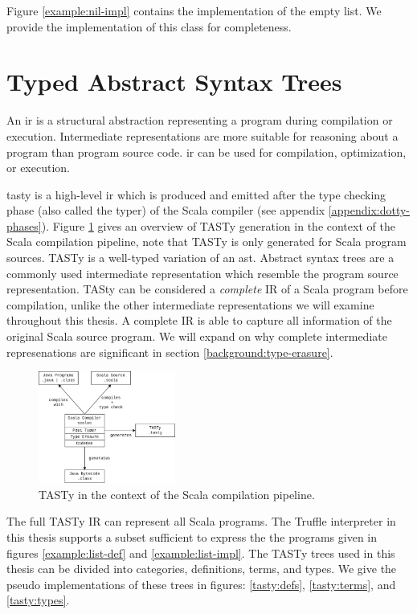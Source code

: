 Figure \ref{example:nil-impl} contains the implementation of the empty list. 
We provide the implementation of this class for completeness.


\section{Typed Abstract Syntax Trees}

An \acrfull{ir} is a structural abstraction representing a program during compilation or execution. 
Intermediate representations are more suitable for reasoning about a program than program source code. 
\acrshort{ir} can be used for compilation\cite{llvm}, optimization\cite{llvm}\cite{ssa}, or execution\cite{java:vm-spec}\cite{clr:spec}.

\acrfull{tasty} is a high-level \acrfull{ir} which is produced and emitted after the type checking phase (also called the typer) of the Scala compiler (see appendix \ref{appendix:dotty-phases}).
Figure \ref{system:tasty} gives an overview of TASTy generation in the context of the Scala compilation pipeline, note that TASTy is only generated for Scala program sources.
TASTy is a well-typed variation of an \acrfull{ast}.
Abstract syntax trees are a commonly used intermediate representation which resemble the program source representation.
TASty can be considered a \textit{complete} IR of a Scala program before compilation, unlike the other intermediate representations we will examine throughout this thesis.
A complete IR is able to capture all information of the original Scala source program.
We will expand on why complete intermediate represenations are significant in section \ref{background:type-erasure}.

\begin{figure}[H]
	\centering
	\includegraphics[width=0.4\textwidth]{figures/scala-pipeline.png}
	\caption{TASTy in the context of the Scala compilation pipeline.}
	\label{system:tasty}
\end{figure}

The full TASTy IR can represent all Scala programs.
The Truffle interpreter in this thesis supports a subset sufficient to express the the programs given in figures \ref{example:list-def} and \ref{example:list-impl}.
The TASTy trees used in this thesis can be divided into categories, definitions, terms, and types. 
We give the pseudo implementations of these trees in figures: \ref{tasty:defs}, \ref{tasty:terms}, and \ref{tasty:types}.

